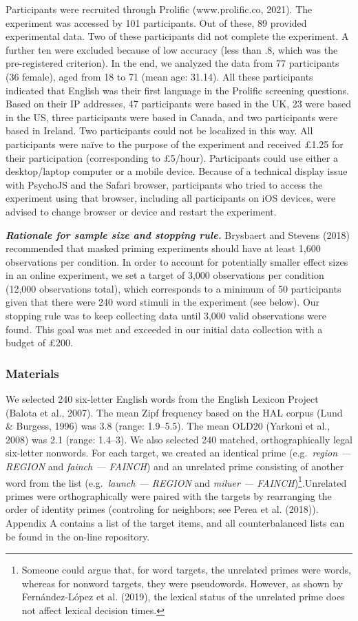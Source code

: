 \documentclass[
  english,
  man,floatsintext]{apa6}
\begin{document}
Participants were recruited through Prolific (www.prolific.co, 2021). The experiment was accessed by 101 participants. Out of these, 89 provided experimental data. Two of these participants did not complete the experiment. A further ten were excluded because of low accuracy (less than .8, which was the pre-registered criterion). In the end, we analyzed the data from 77 participants (36 female), aged from 18 to 71 (mean age: 31.14). All these participants indicated that English was their first language in the Prolific screening questions. Based on their IP addresses, 47 participants were based in the UK, 23 were based in the US, three participants were based in Canada, and two participants were based in Ireland. Two participants could not be localized in this way. All participants were naïve to the purpose of the experiment and received £1.25 for their participation (corresponding to £5/hour). Participants could use either a desktop/laptop computer or a mobile device. Because of a technical display issue with PsychoJS and the Safari browser, participants who tried to access the experiment using that browser, including all participants on iOS devices, were advised to change browser or device and restart the experiment.

\textbf{\emph{Rationale for sample size and stopping rule.}} Brysbaert and Stevens (2018) recommended that masked priming experiments should have at least 1,600 observations per condition. In order to account for potentially smaller effect sizes in an online experiment, we set a target of 3,000 observations per condition (12,000 observations total), which corresponds to a minimum of 50 participants given that there were 240 word stimuli in the experiment (see below). Our stopping rule was to keep collecting data until 3,000 valid observations were found. This goal was met and exceeded in our initial data collection with a budget of £200.

\hypertarget{materials}{%
\subsubsection{Materials}\label{materials}}

We selected 240 six-letter English words from the English Lexicon Project (Balota et al., 2007). The mean Zipf frequency based on the HAL corpus (Lund \& Burgess, 1996) was 3.8 (range: 1.9--5.5). The mean OLD20 (Yarkoni et al., 2008) was 2.1 (range: 1.4--3). We also selected 240 matched, orthographically legal six-letter nonwords. For each target, we created an identical prime (e.g.~\emph{region --- REGION} and \emph{fainch --- FAINCH}) and an unrelated prime consisting of another word from the list (e.g.~\emph{launch --- REGION} and \emph{miluer --- FAINCH})\footnote{Someone could argue that, for word targets, the unrelated primes were words, whereas for nonword targets, they were pseudowords. However, as shown by Fernández-López et al. (2019), the lexical status of the unrelated prime does not affect lexical decision times.}.Unrelated primes were orthographically were paired with the targets by rearranging the order of identity primes (controling for neighbors; see Perea et al. (2018)). Appendix A contains a list of the target items, and all counterbalanced lists can be found in the on-line repository.
\end{document}

